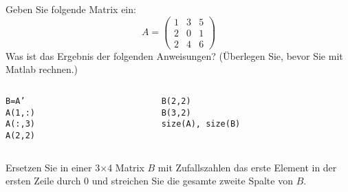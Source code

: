     \secMexercise
    \begin{frame}
        \frameMexercise
        \begin{exercise}
            \sloppy
            Geben Sie folgende Matrix ein:\\
            \begin{displaymath}
                A =
                \begin{pmatrix}
                    1 & 3 & 5 \\
                    2 & 0 & 1 \\
                    2 & 4 & 6
                \end{pmatrix}
            \end{displaymath}
             Was ist das Ergebnis der folgenden Anweisungen? (Überlegen Sie, bevor Sie mit Matlab rechnen.) \\

             \begin{columns}[t]
               \begin{column}{5cm}
                 \texttt{B=A'} \keys{\return} \\
                 \texttt{A(1,:)} \keys{\return} \\
                 \texttt{A(:,3)} \keys{\return} \\
                 \texttt{A(2,2)} \keys{\return} \\
               \end{column}
               \begin{column}{5cm}
                   \texttt{B(2,2)} \keys{\return} \\
                   \texttt{B(3,2)} \keys{\return} \\
                   \texttt{size(A), size(B)} \keys{\return}
               \end{column}
             \end{columns}
        \end{exercise}
    \end{frame}

    \secMexercise
    \begin{frame}
        \frameMexercise
        \begin{exercise}
            \sloppy
            Ersetzen Sie in einer 3$\times$4 Matrix $B$ mit Zufallszahlen das erste Element in der ersten Zeile durch 0 und
            streichen Sie die gesamte zweite Spalte von $B$.
        \end{exercise}
    \end{frame}

